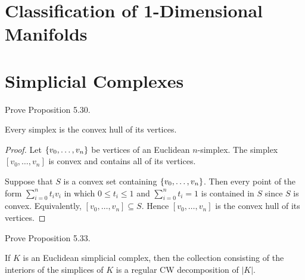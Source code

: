 \section*{Classification of 1-Dimensional Manifolds}


\section*{Simplicial Complexes}

\begin{exercise}{5.31}
	Prove Proposition 5.30.

	Every simplex is the convex hull of its vertices.
\end{exercise}

\begin{proof}
	Let \( \left\{{ v_{0}, \ldots, v_{n} }\right\} \) be vertices of an Euclidean \( n \)-simplex. The simplex \( [v_{0}, \ldots, v_{n}] \) is convex and contains all of its vertices.

	Suppose that \( S \) is a convex set containing \( \left\{{ v_{0}, \ldots, v_{n} }\right\} \). Then every point of the form \( \sum^{n}_{i=0} t_{i}v_{i} \) in which \( 0 \le t_{i} \le 1 \) and \( \sum^{n}_{i=0} t_{i} = 1 \) is contained in \( S \) since \( S \) is convex. Equivalently, \( [v_{0}, \ldots, v_{n}] \subseteq S \). Hence \( [v_{0}, \ldots, v_{n}] \) is the convex hull of its vertices.
\end{proof}

\begin{exercise}{5.34}
	Prove Proposition 5.33.

	If \( K \) is an Euclidean simplicial complex, then the collection consisting of the interiors of the simplices of \( K \) is a regular CW decomposition of \( \left\vert K \right\vert \).
\end{exercise}

